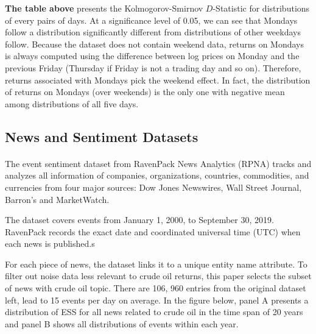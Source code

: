 \documentclass[12pt]{article}
\begin{document}
	\textbf{The table above} presents the Kolmogorov-Smirnov $D$-Statistic for distributions of every pairs of days. At a significance level of 0.05, we can see that Mondays follow a distribution significantly different from distributions of other weekdays follow. Because the dataset does not contain weekend data, returns on Mondays is always computed using the difference between log prices on Monday and the previous Friday (Thursday if Friday is not a trading day and so on). Therefore, returns associated with Mondays pick the weekend effect. In fact, the distribution of returns on Mondays (over weekends) is the only one with negative mean among distributions of all five days.

	\subsection{News and Sentiment Datasets}
	\paragraph{} The event sentiment dataset from RavenPack News Analytics (RPNA) tracks and analyzes all information of companies, organizations, countries, commodities, and currencies from four major sources: Dow Jones Newswires, Wall Street Journal, Barron’s and MarketWatch.
	\par The dataset covers events from January 1, 2000, to September 30, 2019. RavenPack records the exact date and coordinated universal time (UTC) when each news is published.s
	\par For each piece of news, the dataset links it to a unique entity name attribute. To filter out noise data less relevant to crude oil returns, this paper selects the subset of news with crude oil topic. There are 106, 960 entries from the original dataset left, lead to 15 events per day on average. In the figure below, panel A presents a distribution of ESS for all news related to crude oil in the time span of 20 years and panel B shows all distributions of events within each year.
\end{document}
